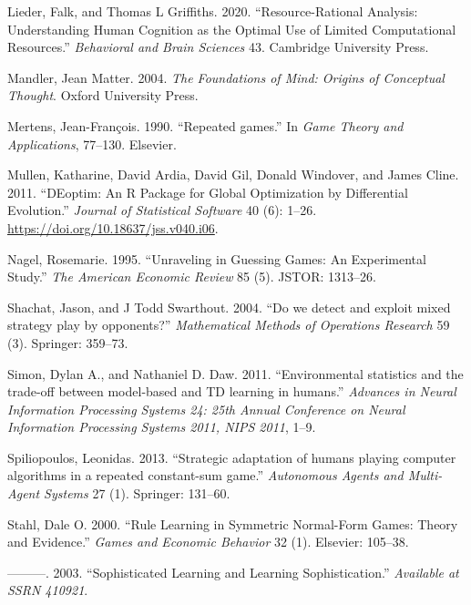 \documentclass[smallextended]{svjour3}       %
\begin{document}
\leavevmode\hypertarget{ref-lieder2020resource}{}%
Lieder, Falk, and Thomas L Griffiths. 2020. ``Resource-Rational
Analysis: Understanding Human Cognition as the Optimal Use of Limited
Computational Resources.'' \emph{Behavioral and Brain Sciences} 43.
Cambridge University Press.

\leavevmode\hypertarget{ref-mandler2004foundations}{}%
Mandler, Jean Matter. 2004. \emph{The Foundations of Mind: Origins of
Conceptual Thought}. Oxford University Press.

\leavevmode\hypertarget{ref-mertens1990repeated}{}%
Mertens, Jean-François. 1990. ``Repeated games.'' In \emph{Game Theory
and Applications}, 77--130. Elsevier.

\leavevmode\hypertarget{ref-R-DEoptim}{}%
Mullen, Katharine, David Ardia, David Gil, Donald Windover, and James
Cline. 2011. ``DEoptim: An R Package for Global Optimization by
Differential Evolution.'' \emph{Journal of Statistical Software} 40 (6):
1--26. \url{https://doi.org/10.18637/jss.v040.i06}.

\leavevmode\hypertarget{ref-nagel1995unraveling}{}%
Nagel, Rosemarie. 1995. ``Unraveling in Guessing Games: An Experimental
Study.'' \emph{The American Economic Review} 85 (5). JSTOR: 1313--26.

\leavevmode\hypertarget{ref-shachat2004we}{}%
Shachat, Jason, and J Todd Swarthout. 2004. ``Do we detect and exploit
mixed strategy play by opponents?'' \emph{Mathematical Methods of
Operations Research} 59 (3). Springer: 359--73.

\leavevmode\hypertarget{ref-Simon_Daw_11}{}%
Simon, Dylan A., and Nathaniel D. Daw. 2011. ``Environmental statistics
and the trade-off between model-based and TD learning in humans.''
\emph{Advances in Neural Information Processing Systems 24: 25th Annual
Conference on Neural Information Processing Systems 2011, NIPS 2011},
1--9.

\leavevmode\hypertarget{ref-spiliopoulos2013strategic}{}%
Spiliopoulos, Leonidas. 2013. ``Strategic adaptation of humans playing
computer algorithms in a repeated constant-sum game.'' \emph{Autonomous
Agents and Multi-Agent Systems} 27 (1). Springer: 131--60.

\leavevmode\hypertarget{ref-stahl2000rule}{}%
Stahl, Dale O. 2000. ``Rule Learning in Symmetric Normal-Form Games:
Theory and Evidence.'' \emph{Games and Economic Behavior} 32 (1).
Elsevier: 105--38.

\leavevmode\hypertarget{ref-stahl2003sophisticated}{}%
---------. 2003. ``Sophisticated Learning and Learning Sophistication.''
\emph{Available at SSRN 410921}.
\end{document}
